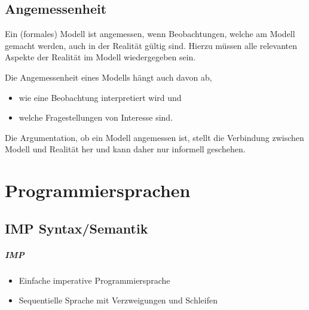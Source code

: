						\section{Angemessenheit}
							Ein (formales) Modell ist angemessen, wenn Beobachtungen, welche am Modell gemacht werden, auch in der Realität gültig sind. Hierzu müssen alle relevanten Aspekte der Realität im Modell wiedergegeben sein.

							Die Angemessenheit eines Modells hängt auch davon ab,
							\begin{itemize}
								\item wie eine Beobachtung interpretiert wird und
								\item welche Fragestellungen von Interesse sind.
							\end{itemize}

							Die Argumentation, ob ein Modell angemessen ist, stellt die Verbindung zwischen Modell und Realität her und kann daher nur informell geschehen.

					\chapter{Programmiersprachen}
						\section{IMP Syntax/Semantik}
							\paragraph{IMP}
								\begin{itemize}
									\item Einfache imperative Programmiersprache
									\item Sequentielle Sprache mit Verzweigungen und Schleifen
								\end{itemize}

